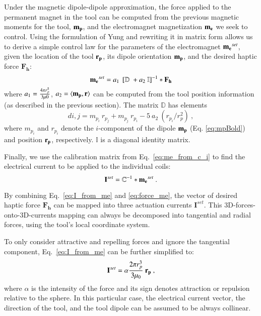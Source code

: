 Under the magnetic dipole-dipole approximation, the force applied to the permanent magnet in the tool can be computed from the previous magnetic moments for the tool, $\mathbf{m_p}$, and the electromagnet magnetization $\mathbf{m_{e}}$ we seek to control. Using the formulation of Yung \etal\cite{yung1998analytic} and rewriting it in matrix form allows us to derive a simple control law for the parameters of the electromagnet $\mathbf{m_{e}}^{set}$, given the location of the tool $\mathbf{r_{p}}$, its dipole orientation $\mathbf{m_p}$, and the desired haptic force $\mathbf{F_h}$:
\begin{equation}
\mathbf{m_{e}}^{set} = a_1 \ \left[\mathbb{D} \ + a_2 \ \mathbb{I}\right]^{-1} * \mathbf{F_h} \label{eq:force_me}
\end{equation}
\noindent where $a_1 = \frac{4\pi r_{p}^{5}}{3\mu {0}}$, $a_2 = \langle\mathbf{m_p},\mathbf{r}\rangle$ can be computed from the tool position information (as described in the previous section).
The matrix $\mathbb{D}$ has elements
\begin{equation}\label{eq:d_ij}
d{i,j} = m_{p_i} \ r_{p_j} + m_{p_j} \ r_{p_i} - 5 \ a_2 \ (r_{p_i} / r_p^2) \ ,
\end{equation}
\noindent where $m_{p_{i}}$ and $r_{p_{i}}$ denote the $i$-component of the dipole $\mathbf{m_p}$ (Eq. \ref{eq:mpBold}) and position $\mathbf{r_{p}}$, respectively.
$\mathbb{I}$ is a diagonal identity matrix.

Finally, we use the calibration matrix from Eq.~\ref{eq:me_from_c_i} to find the electrical current to be applied to the individual coils:
\begin{equation}\label{eq:I_from_me}
\mathbf{I}^{set} = \mathbb{C}^{-1} * \mathbf{m_{e}}^{set} \ .
\end{equation}

By combining Eq.~\ref{eq:I_from_me} and \ref{eq:force_me}, the vector of desired haptic force $\mathbf{F_h}$ can be mapped into three actuation currents $\mathbf{I}^{set}$. This 3D-forces-onto-3D-currents mapping can always be decomposed into tangential and radial forces, using the tool's local coordinate system.

To only consider attractive and repelling forces and ignore the tangential component, Eq.~\ref{eq:I_from_me} can be further simplified to:
\begin{equation}
\mathbf{I}^{set} = \alpha \frac{2\pi r_{p}^{3}}{3\mu _{0}} \ \mathbf{r_{p}} \ ,
\end{equation}
\noindent where $\alpha$ is the intensity of the force and its sign denotes attraction or repulsion relative to the sphere. In this particular case, the electrical current vector, the direction of the tool, and the tool dipole can be assumed to be always collinear.

